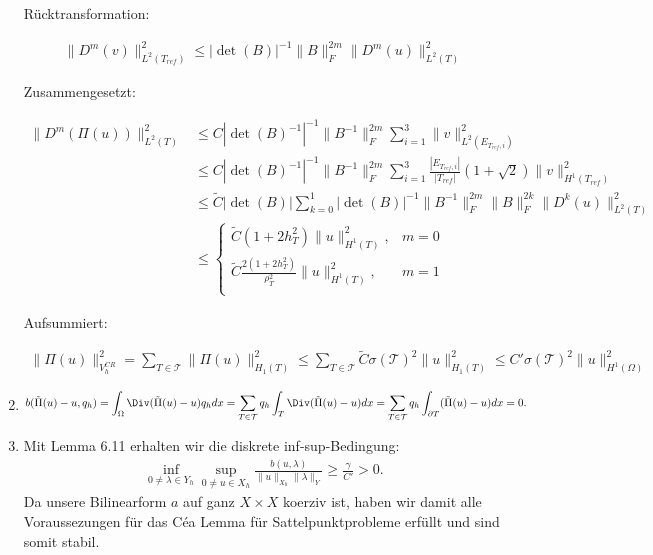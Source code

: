 \begin{solution}
\begin{enumerate}[label = \textbf{\alph*)}]
Rücktransformation:

\begin{align*}
  \|D^m(v)\|_{L^2(T_{ref})}^2 \leq |\det(B)|^{-1}\|B\|_F^{2m}\|D^m(u)\|_{L^2(T)}^2
\end{align*}

Zusammengesetzt:

\begin{align*}
  \|D^m(\Pi(u))\|_{L^2(T)}^2 &\leq C|\det(B)^{-1}|^{-1}\|B^{-1}\|_F^{2m} \sum_{i=1}^{3}\|v\|_{L^2(E_{T_{ref},i})}^2  \\
  &\leq C|\det(B)^{-1}|^{-1}\|B^{-1}\|_F^{2m} \sum_{i=1}^{3}\frac{|E_{T_{ref},i}|}{|T_{ref}|}
  \left(1 + \sqrt{2}\right)\|v\|_{H^1(T_{ref})}^2 \\
  &\leq \tilde{C}|\det(B)|
  \sum_{k=0}^1 |\det(B)|^{-1}\|B^{-1}\|_F^{2m}\|B\|_F^{2k}\|D^k(u)\|_{L^2(T)}^2 \\
  &\leq \begin{cases}
  \tilde{C}(1  + 2h_T^2)\|u\|_{H^1(T)}^2, & m = 0 \\
  \tilde{C}\frac{2(1 + 2h_T^2)}{\rho_T^2}\|u\|_{H^1(T)}^2, & m = 1 \\
  \end{cases}
\end{align*}

Aufsummiert:

\begin{align*}
  \|\Pi(u)\|_{V_h^{CR}}^2 = \sum_{T \in \mathcal{T}}\|\Pi(u)\|_{H_1(T)}^2
  \leq \sum_{T \in \mathcal{T}}\tilde{C}\sigma(\mathcal{T})^2\|u\|_{H_1(T)}^2
  \leq C'\sigma(\mathcal{T})^2\|u\|_{H^1(\Omega)}^2
\end{align*}

  \item

  \begin{align*}
    b(\tilde{\Pi}(u) - u, q_h) = \int_\Omega \Div(\tilde{\Pi}(u) - u)q_h dx
    = \sum_{T \in \mathcal{T}}q_h\int_T \Div(\tilde{\Pi}(u) - u) dx
    = \sum_{T \in \mathcal{T}}q_h\int_{\partial T} (\tilde{\Pi}(u) - u) dx = 0.
  \end{align*}

  \item Mit Lemma 6.11 erhalten wir die diskrete inf-sup-Bedingung:
  \begin{align*}
    \inf_{0 \neq \lambda \in Y_h}\sup_{0 \neq u \in X_h}\frac{b(u,\lambda)}{\|u\|_{X_h}\|\lambda\|_Y}
    \geq \frac{\gamma}{C'} > 0.
  \end{align*}
  Da unsere Bilinearform $a$ auf ganz $X \times X$ koerziv ist, haben wir damit
  alle Voraussezungen für das Céa Lemma für Sattelpunktprobleme
  erfüllt und sind somit stabil.
\end{enumerate}


\end{solution}

